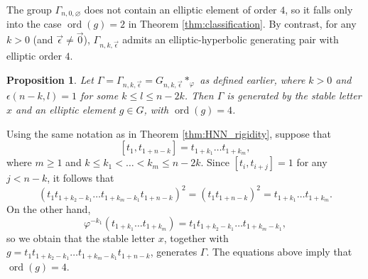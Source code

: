\documentclass[12pt,leqno]{amsart}
\makeatletter
\renewenvironment{proof}[1][\proofname]{%
	\par
	\pushQED{\qed}%
	\normalfont
	\topsep6\p@\@plus6\p@\relax
	\trivlist
	\item[\hskip\labelsep\itshape #1\@addpunct{.}]%
	\ignorespaces
}{%
	\par\nobreak\vspace{2pt}%
	\popQED%
	\medskip%
	\endtrivlist
	\@endpefalse
}
\newcommand{\2}{L^2_{\rm per}(0, T)}
\newtheorem{prop}{Proposition}[section]
\newcommand{\ord}{{\operatorname{ord}}}
\numberwithin{equation}{section}
\numberwithin{figure}{section}
\makeatother
\begin{document}
The group $\Gamma_{n,0,\varnothing}$ does not contain an elliptic element of order $4$, so it falls only into the case $\ord(g)=2$ in Theorem \ref{thm:classification}. By contrast, for any $k>0$ (and $\vec{\epsilon}\neq \vec{0}$), $\Gamma_{n,k,\vec{\epsilon}}$ admits an elliptic-hyperbolic generating pair with elliptic order $4$.
\begin{prop}
    Let $\Gamma = \Gamma_{n,k,\vec{\epsilon}} = G_{n,k,\vec{\epsilon}}*_\varphi$ as defined earlier, where $k>0$ and $\epsilon(n-k,l)=1$ for some $k\leq l\leq n-2k$. Then $\Gamma$ is generated by the stable letter $x$ and an elliptic element $g\in G$, with $\ord(g) = 4$.
\end{prop}
\begin{proof}
    Using the same notation as in Theorem \ref{thm:HNN_rigidity}, suppose that
    \[
    [t_1,t_{1+n-k}] = t_{1+k_1}\dots t_{1+k_m},
    \]
    where $m\geq 1$ and $k\leq k_1<\dots <k_m\leq n-2k$. Since $[t_i,t_{i+j}] = 1$ for any $j< n-k$, it follows that
    \[
    (t_1t_{1+k_2-k_1}\dots t_{1+k_m-k_1}t_{1+n-k})^2 = (t_1t_{1+n-k})^2 = t_{1+k_1}\dots t_{1+k_m}.
    \]
    On the other hand,
    \[
    \varphi^{-k_1}(t_{1+k_1}\dots t_{1+k_m}) = t_1t_{1+k_2-k_1}\dots t_{1+k_m-k_1},
    \]
    so we obtain that the stable letter $x$, together with $g = t_1t_{1+k_2-k_1}\dots t_{1+k_m-k_1}t_{1+n-k}$, generates $\Gamma$. The equations above imply that $\ord(g) = 4$.
\end{proof}
\end{document}
